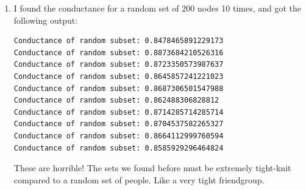 \documentclass[12pt]{article}
\begin{document}
\begin{enumerate}[leftmargin=\labelsep, label=(\alph*)]
        \item I found the conductance for a random set of 200 nodes 10 times, and got the following output:
        \begin{lstlisting}
Conductance of random subset: 0.8478465891229173
Conductance of random subset: 0.8873684210526316
Conductance of random subset: 0.8723350573987637
Conductance of random subset: 0.8645857241221023
Conductance of random subset: 0.8687306501547988
Conductance of random subset: 0.862488306828812
Conductance of random subset: 0.8714285714285714
Conductance of random subset: 0.8704537582265327
Conductance of random subset: 0.8664112999760594
Conductance of random subset: 0.8585929296464824
        \end{lstlisting}
        These are horrible! The sets we found before must be extremely tight-knit compared to a random set of people. Like a very tight friendgroup.
    \end{enumerate}
\end{document}
